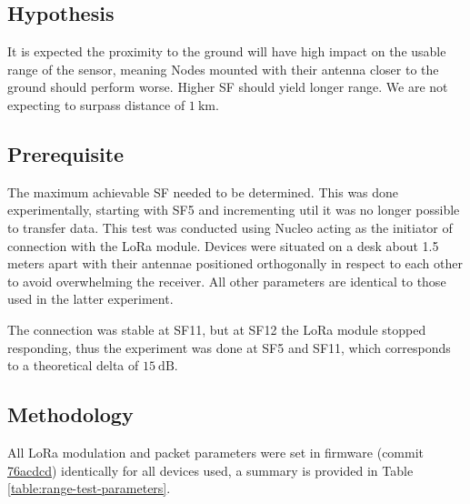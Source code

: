 \subsection{Hypothesis}
It is expected the proximity to the ground will have high impact on the usable range of the sensor, meaning Nodes mounted with their antenna closer to the ground should perform worse. Higher SF should yield longer range. We are not expecting to surpass distance of $1~\mathrm{km}$.

\subsection{Prerequisite}
The maximum achievable SF needed to be determined. This was done experimentally, starting with SF5 and incrementing util it was no longer possible to transfer data. This test was conducted using Nucleo acting as the initiator of connection with the LoRa module. Devices were situated on a desk about 1.5 meters apart with their antennae positioned orthogonally in respect to each other to avoid overwhelming the receiver. All other parameters are identical to those used in the latter experiment.

The connection was stable at SF11, but at SF12 the LoRa module stopped responding, thus the experiment was done at SF5 and SF11, which corresponds to a theoretical delta of $15~\mathrm{dB}$.

\subsection{Methodology}
All LoRa modulation and packet parameters were set in firmware (commit \href{https://github.com/manakjiri/lora-module-fw/tree/76acdcd7b31f259c88f1808ed79886dc26295b4e}{76acdcd}) identically for all devices used, a summary is provided in Table \ref{table:range-test-parameters}. 

